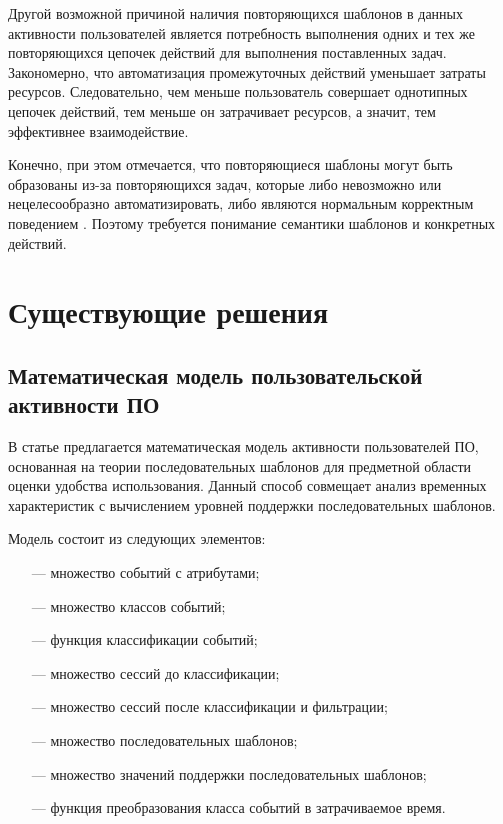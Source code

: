 Другой возможной причиной наличия повторяющихся шаблонов в данных активности пользователей является потребность выполнения одних и
тех же повторяющихся цепочек действий для выполнения поставленных задач. Закономерно, что автоматизация промежуточных действий уменьшает затраты ресурсов. Следовательно, чем меньше пользователь совершает однотипных цепочек действий, тем меньше он затрачивает ресурсов, а значит, тем эффективнее взаимодействие.

Конечно, при этом отмечается, что повторяющиеся шаблоны могут быть образованы из-за повторяющихся задач, которые либо невозможно или
нецелесообразно автоматизировать, либо являются нормальным корректным поведением \cite{1}. Поэтому требуется понимание семантики шаблонов и конкретных действий.

\section{Существующие решения}

\subsection{Математическая модель пользовательской активности ПО}
В статье \cite{mat_model} предлагается математическая модель активности пользователей ПО, основанная на теории последовательных шаблонов для предметной области оценки удобства использования. Данный способ совмещает анализ временных характеристик с вычислением уровней поддержки последовательных шаблонов.

Модель состоит из следующих элементов:
\begin{itemize}
	\item[---] множество событий с атрибутами;
	\item[---] множество классов событий;
	\item[---] функция классификации событий;
	\item[---] множество сессий до классификации;
	\item[---] множество сессий после классификации и фильтрации;
	\item[---] множество последовательных шаблонов;
	\item[---] множество значений поддержки последовательных шаблонов;
	\item[---] функция преобразования класса событий в затрачиваемое время.
\end{itemize}


